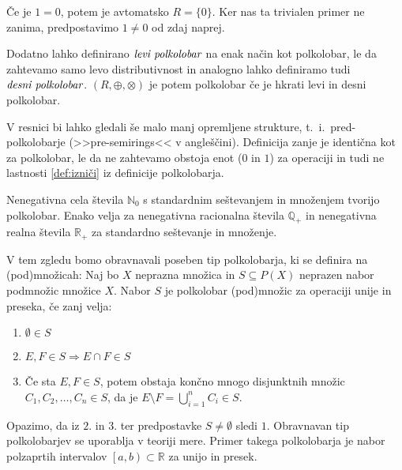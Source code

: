 \documentclass[mat1]{fmfdelo}
\newcommand{\R}{\mathbb{R}}
\newcommand{\N}{\mathbb{N}}
\newcommand{\No}{\N_0}
\newcommand{\Pplus}[1]{\mathbb{#1}_{+}}
\newcommand{\pojem}[1]{\ensuremath{\emph{#1}}}
\begin{document}
\begin{opomba}
	Če je $1 = 0$, potem je avtomatsko $R = \{0\}$. Ker nas ta trivialen primer ne zanima, predpostavimo $1 \neq 0$ od zdaj naprej.
\end{opomba}

\begin{opomba}
	Dodatno lahko definirano \pojem{levi polkolobar} na enak način kot polkolobar, le da zahtevamo samo levo distributivnost in analogno lahko definiramo tudi \pojem{desni polkolobar}. $(R,\oplus, \otimes)$ je potem polkolobar če je hkrati levi in desni polkolobar.
\end{opomba}
\begin{opomba}
	V resnici bi lahko gledali še malo manj opremljene strukture, t.~i.~pred-polkolobarje (>>pre-semirings<< v angleščini). Definicija zanje je identična kot za polkolobar, le da ne zahtevamo obstoja enot ($0$ in $1$) za operaciji in tudi ne lastnosti \ref{def:izniči} iz definicije polkolobarja.
\end{opomba}
\begin{zgled}
	Nenegativna cela števila $\No$ s standardnim seštevanjem in množenjem tvorijo polkolobar. Enako velja za nenegativna racionalna števila $\Pplus{Q}$ in nenegativna realna števila $\Pplus{R}$ za standardno seštevanje in množenje.
\end{zgled}

\begin{zgled}
	V tem zgledu bomo obravnavali poseben tip polkolobarja, ki se definira na (pod)množicah:
	Naj bo $X$ neprazna množica in $S \subseteq P(X)$ neprazen nabor podmnožic množice $X$. Nabor $S$ je polkolobar (pod)množic za operaciji unije in preseka, če zanj velja:
	\begin{enumerate}
		\item $\emptyset\in S$
		\item $E, F\in S \Rightarrow E\cap F \in S$
		\item Če sta $E, F \in S$, potem obstaja končno mnogo disjunktnih množic \\ $C_{1}, C_{2}, \ldots, C_{n} \in S$, da je $E\setminus F = \bigcup_{i = 1}^{n}C_i \in S$.
	\end{enumerate}

	Opazimo, da iz $2.$ in $3.$ ter predpostavke $S\neq\emptyset$ sledi $1.$ Obravnavan tip polkolobarjev se uporablja v teoriji mere. Primer takega polkolobarja je nabor polzaprtih intervalov $\left[a, b\right) \subset \R$ za unijo in presek.
\end{zgled}
\end{document}
